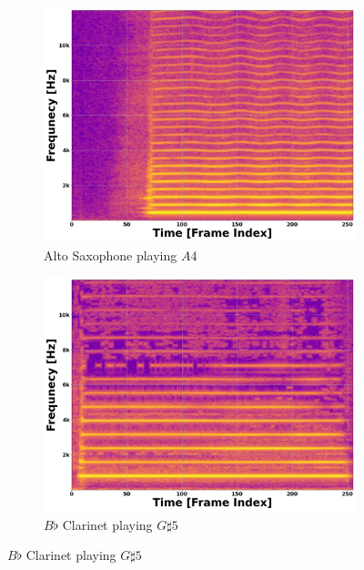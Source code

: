 \documentclass[12pt,letterpaper]{article}
\begin{document}
\begin{figure}[H]
	\begin{subfigure}{0.45\textwidth}
	\centering
	\includegraphics[scale=0.2]{../FiguresSpectrogram/AltoSax-A4}
	\caption{Alto Saxophone playing $A4$}
	\end{subfigure}
	\hfill
	\begin{subfigure}{0.45\textwidth}
	\centering
	\includegraphics[scale=0.2]{../FiguresSpectrogram/Clarinet-Gs5}
	\caption{$B\flat$ Clarinet playing $G\sharp 5$}
	\end{subfigure}
	

\end{figure}
\end{document}
